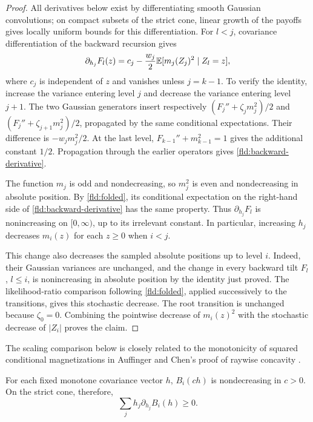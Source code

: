 \begin{proof}
All derivatives below exist by differentiating smooth Gaussian
convolutions; on compact subsets of the strict cone, linear growth of
the payoffs gives locally uniform bounds for this differentiation.
For $l<j$, covariance differentiation of the backward recursion gives
\begin{equation}\label{fld:backward-derivative}
 \partial_{h_j}F_l(z)
 =c_j-\frac{w_j}{2}
    \mathbb E[m_j(Z_j)^2\mid Z_l=z],
\end{equation}
where $c_j$ is independent of $z$ and vanishes unless $j=k-1$.
To verify the identity, increase the variance entering level $j$ and
decrease the variance entering level $j+1$. The two Gaussian generators
insert respectively
$(F_j''+\zeta_j m_j^2)/2$ and
$(F_j''+\zeta_{j+1}m_j^2)/2$, propagated by the same conditional
expectations. Their difference is $-w_jm_j^2/2$. At the last level,
$F_{k-1}''+m_{k-1}^2=1$ gives the additional constant $1/2$.
Propagation through the earlier operators gives
\eqref{fld:backward-derivative}.

The function $m_j$ is odd and nondecreasing, so $m_j^2$ is even and
nondecreasing in absolute position. By \eqref{fld:folded}, its
conditional expectation on the right-hand side of
\eqref{fld:backward-derivative} has the same property. Thus
$\partial_{h_j}F_l$ is nonincreasing on $[0,\infty)$, up to its
irrelevant constant. In particular, increasing $h_j$ decreases
$m_i(z)$ for each $z\geq0$ when $i<j$.

This change also decreases the sampled absolute positions up to
level $i$. Indeed, their Gaussian variances are unchanged, and the
change in every backward tilt $F_l$, $l\leq i$, is nonincreasing in
absolute position by the identity just proved. The likelihood-ratio
comparison following \eqref{fld:folded}, applied successively to the
transitions, gives this stochastic decrease. The root transition is
unchanged because $\zeta_0=0$. Combining the pointwise decrease of
$m_i(z)^2$ with the stochastic decrease of $|Z_i|$ proves the claim.
\end{proof}

The scaling comparison below is closely related to the monotonicity of
squared conditional magnetizations in Auffinger and Chen's proof of
raywise concavity \cite[Theorem~1 and its proof]{AuffingerChen2016}.

\begin{lemma}\label{fld:radial}
For each fixed monotone covariance vector $h$, $B_i(ch)$ is
nondecreasing in $c>0$. On the strict cone, therefore,
\begin{equation}\label{fld:radial-derivative}
 \sum_jh_j\partial_{h_j}B_i(h)\geq0.
\end{equation}
\end{lemma}

